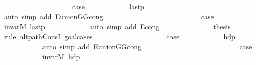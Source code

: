 \begin{isabellebody}
\isanewline
\ \ \ \ \ \ \ \ \isamarkupfalse%
\ {}\isanewline
\ \ \ \ \ \ \ \ \isamarkupfalse%
\ {\isacharquery}{\kern0pt}case\isanewline
\ \ \ \ \ \ \ \ \ \ \isamarkupfalse%
\ last{\isacharunderscore}{\kern0pt}p{\isacharprime}{\kern0pt}\isanewline
\ \ \ \ \ \ \ \ \ \ \isamarkupfalse%
\ {\isacharparenleft}{\kern0pt}auto\ simp\ add{\isacharcolon}{\kern0pt}\ E{\isacharunderscore}{\kern0pt}union{\isacharunderscore}{\kern0pt}G{}{\isacharunderscore}{\kern0pt}G{}{\isacharunderscore}{\kern0pt}cong{\isacharparenright}{\kern0pt}\isanewline
\ \ \ \ \ \ \isamarkupfalse%
\isanewline
\ \ \ \ \ \ \ \ \isamarkupfalse%
\ {}\isanewline
\ \ \ \ \ \ \ \ \isamarkupfalse%
\ {\isacharquery}{\kern0pt}case\isanewline
\ \ \ \ \ \ \ \ \ \ \isamarkupfalse%
\ invar{\isacharunderscore}{\kern0pt}M\ last{\isacharunderscore}{\kern0pt}p{\isacharprime}{\kern0pt}\isanewline
\ \ \ \ \ \ \ \ \ \ \isamarkupfalse%
\ {\isacharparenleft}{\kern0pt}auto\ simp\ add{\isacharcolon}{\kern0pt}\ E{}{\isacharunderscore}{\kern0pt}cong{\isacharparenright}{\kern0pt}\isanewline
\ \ \ \ \ \ \isamarkupfalse%
\isanewline
\ \ \ \ \ \ \isamarkupfalse%
\ {\isacharquery}{\kern0pt}thesis\isanewline
\ \ \ \ \ \ \isamarkupfalse%
\ {\isacharparenleft}{\kern0pt}rule\ alt{\isacharunderscore}{\kern0pt}path{\isacharunderscore}{\kern0pt}ConsI{\isacharcomma}{\kern0pt}\ goal{\isacharunderscore}{\kern0pt}cases{\isacharparenright}{\kern0pt}\isanewline
\ \ \ \ \ \ \ \ \isamarkupfalse%
\ {}\isanewline
\ \ \ \ \ \ \ \ \isamarkupfalse%
\ {\isacharquery}{\kern0pt}case\isanewline
\ \ \ \ \ \ \ \ \ \ \isamarkupfalse%
\ hd{\isacharunderscore}{\kern0pt}p{\isacharprime}{\kern0pt}\isanewline
\ \ \ \ \ \ \ \ \ \ \isamarkupfalse%
\ {\isacharparenleft}{\kern0pt}auto\ simp\ add{\isacharcolon}{\kern0pt}\ E{\isacharunderscore}{\kern0pt}union{\isacharunderscore}{\kern0pt}G{}{\isacharunderscore}{\kern0pt}G{}{\isacharunderscore}{\kern0pt}cong{\isacharparenright}{\kern0pt}\isanewline
\ \ \ \ \ \ \isamarkupfalse%
\isanewline
\ \ \ \ \ \ \ \ \isamarkupfalse%
\ {}\isanewline
\ \ \ \ \ \ \ \ \isamarkupfalse%
\ {\isacharquery}{\kern0pt}case\isanewline
\ \ \ \ \ \ \ \ \ \ \isamarkupfalse%
\ invar{\isacharunderscore}{\kern0pt}M\ hd{\isacharunderscore}{\kern0pt}p{\isacharprime}{\kern0pt}\isanewline

\end{isabellebody}
